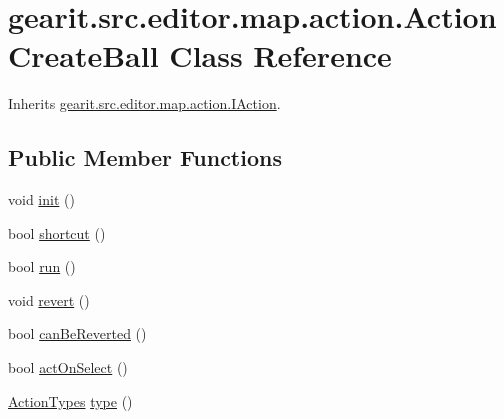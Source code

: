 \hypertarget{classgearit_1_1src_1_1editor_1_1map_1_1action_1_1_action_create_ball}{\section{gearit.\+src.\+editor.\+map.\+action.\+Action\+Create\+Ball Class Reference}
\label{classgearit_1_1src_1_1editor_1_1map_1_1action_1_1_action_create_ball}
}


Inherits \hyperlink{interfacegearit_1_1src_1_1editor_1_1map_1_1action_1_1_i_action}{gearit.\+src.\+editor.\+map.\+action.\+I\+Action}.

\subsection*{Public Member Functions}
\begin{DoxyCompactItemize}
\item 
void \hyperlink{classgearit_1_1src_1_1editor_1_1map_1_1action_1_1_action_create_ball_ac517e2563efbaab7f72823888482e53f}{init} ()
\item 
bool \hyperlink{classgearit_1_1src_1_1editor_1_1map_1_1action_1_1_action_create_ball_a312817e59e51e0ea0e2231fae3fc38bf}{shortcut} ()
\item 
bool \hyperlink{classgearit_1_1src_1_1editor_1_1map_1_1action_1_1_action_create_ball_aad34d4ca441f91ed68db8eba5ea8aa94}{run} ()
\item 
void \hyperlink{classgearit_1_1src_1_1editor_1_1map_1_1action_1_1_action_create_ball_a0e13afbb992977264e4f25b85330ef66}{revert} ()
\item 
bool \hyperlink{classgearit_1_1src_1_1editor_1_1map_1_1action_1_1_action_create_ball_af9c509f48d8b610222af0ec6d63fbee6}{can\+Be\+Reverted} ()
\item 
bool \hyperlink{classgearit_1_1src_1_1editor_1_1map_1_1action_1_1_action_create_ball_a3b9f27c101874cdfc54394e07656e18a}{act\+On\+Select} ()
\item 
\hyperlink{namespacegearit_1_1src_1_1editor_1_1map_1_1action_af036712a7d960b13d1e31954e65c00e3}{Action\+Types} \hyperlink{classgearit_1_1src_1_1editor_1_1map_1_1action_1_1_action_create_ball_a866ff8bebbc4560cc4793a9200c73df6}{type} ()
\end{DoxyCompactItemize}


